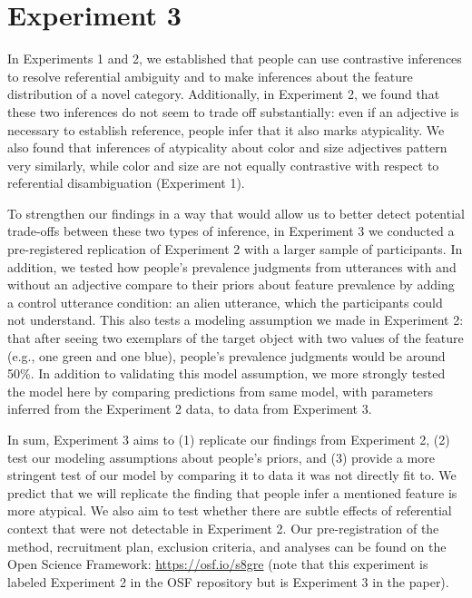 \documentclass[
  english,
  man,floatsintext]{apa6}
\begin{document}
\hypertarget{experiment-3}{%
\section{Experiment 3}\label{experiment-3}}

In Experiments 1 and 2, we established that people can use contrastive inferences to resolve referential ambiguity and to make inferences about the feature distribution of a novel category. Additionally, in Experiment 2, we found that these two inferences do not seem to trade off substantially: even if an adjective is necessary to establish reference, people infer that it also marks atypicality. We also found that inferences of atypicality about color and size adjectives pattern very similarly, while color and size are not equally contrastive with respect to referential disambiguation (Experiment 1).

To strengthen our findings in a way that would allow us to better detect potential trade-offs between these two types of inference, in Experiment 3 we conducted a pre-registered replication of Experiment 2 with a larger sample of participants. In addition, we tested how people's prevalence judgments from utterances with and without an adjective compare to their priors about feature prevalence by adding a control utterance condition: an alien utterance, which the participants could not understand. This also tests a modeling assumption we made in Experiment 2: that after seeing two exemplars of the target object with two values of the feature (e.g., one green and one blue), people's prevalence judgments would be around 50\%. In addition to validating this model assumption, we more strongly tested the model here by comparing predictions from same model, with parameters inferred from the Experiment 2 data, to data from Experiment 3.

In sum, Experiment 3 aims to (1) replicate our findings from Experiment 2, (2) test our modeling assumptions about people's priors, and (3) provide a more stringent test of our model by comparing it to data it was not directly fit to. We predict that we will replicate the finding that people infer a mentioned feature is more atypical. We also aim to test whether there are subtle effects of referential context that were not detectable in Experiment 2. Our pre-registration of the method, recruitment plan, exclusion criteria, and analyses can be found on the Open Science Framework: \url{https://osf.io/s8gre} (note that this experiment is labeled Experiment 2 in the OSF repository but is Experiment 3 in the paper).
\end{document}
